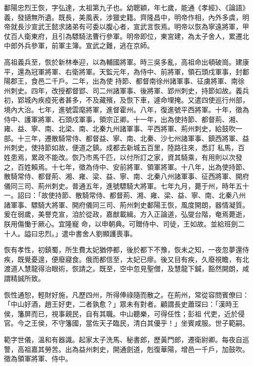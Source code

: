 \begin{pinyinscope}
 鄱陽忠烈王恢，字弘達，太祖第九子也。幼聰穎，年七歲，能通《孝經》、《論語》義，發擿無所遺。既長，美風表，涉獵史籍。齊隆昌中，明帝作相，內外多虞，明帝就長沙宣武王懿求諸弟有可委以腹心者，宣武言恢焉。明帝以恢為寧遠將軍，甲仗百人衛東府，且引為驃騎法曹行參軍。明帝即位，東宮建，為太子舍人，累遷北中郎外兵參軍，前軍主簿。宣武之難，逃在京師。



 高祖義兵至，恢於新林奉迎，以為輔國將軍。時三吳多亂，高祖命出頓破崗。建康平，還為冠軍將軍、右衛將軍。天監元年，為侍中、前將軍，領石頭戍軍事，封鄱陽郡王，食邑二千戶。二年，出為使
 持節、都督南徐州諸軍事、征虜將軍、南徐州刺史。四年，改授都督郢、司二州諸軍事、後將軍、郢州刺史，持節如故。義兵初，郢城內疾疫死者甚多，不及藏殯，及恢下車，遽命埋掩。又遣四使巡行州部，境內大治。七年，進號雲麾將軍，進督霍州。八年，復進號平西將軍。十年，徵為侍中、護軍將軍、石頭戍軍事，領宗正卿。十一年，出為使持節、都督荊、湘、雍、益、寧、南、北梁、南、北秦九州諸軍事、平西將軍、荊州刺史，給鼓吹一部。十三年，遷散騎常侍、都督益、寧、南、北秦、沙七州諸軍事、鎮西將軍、益州刺史，使持節如故，便道之鎮。成都去新城五百里，陸路往來，悉訂
 私馬，百姓患焉，累政不能改。恢乃市馬千匹，以付所訂之家，資其騎乘，有用則以次發之，百姓賴焉。十七年，徵為侍中、安前將軍、領軍將軍。十八年，出為使持節、散騎常侍、都督荊、湘、雍、梁、益、寧、南、北秦八州諸軍事、征西將軍、開府儀同三司、荊州刺史。普通五年，進號驃騎大將軍。七年九月，薨于州，時年五十一。詔曰：「故使持節、散騎常侍、都督荊、湘、雍、梁、益、寧、南、北秦八州諸軍事、驃騎大將軍、開府儀同三司、荊州刺史鄱陽王恢，風度開朗，器情凝質。爰在弱歲，美譽克宣，洎於從政，嘉猷載緝。方入正論道，弘燮台階，奄焉薨逝，朕用傷慟于厥心。宜隆寵
 命，以申朝典。可贈侍中、司徒，王如故。並給班劍二十人。謚曰忠烈。」遣中書舍人劉顯護喪事。



 恢有孝性，初鎮蜀，所生費太妃猶停都，後於都下不豫，恢未之知，一夜忽夢還侍疾，既覺憂遑，便廢寢食。俄而都信至，太妃已瘳。後又目有疾，久廢視瞻，有北渡道人慧龍得治眼術，恢請之。既至，空中忽見聖僧，及慧龍下鍼，豁然開朗，咸謂精誠所致。



 恢性通恕，輕財好施，凡歷四州，所得俸祿隨而散之。在荊州，常從容問賓僚曰：「中山好酒，趙王好吏，二者孰愈？」眾未有對者。顧謂長史蕭琛曰：「漢時王侯，籓屏而已，視事親民，自有其職。中山聽樂，可得任性；彭祖
 代吏，近於侵官。今之王侯，不守籓國，當佐天子臨民，清白其優乎！」坐賓咸服。世子範嗣。



 範字世儀，溫和有器識。起家太子洗馬、秘書郎，歷黃門郎，遷衛尉卿。每夜自巡警，高祖嘉其勞苦。出為益州刺史，開通劍道，剋復華陽，增邑一千戶，加鼓吹。徵為領軍將軍、侍中。




\end{pinyinscope}
